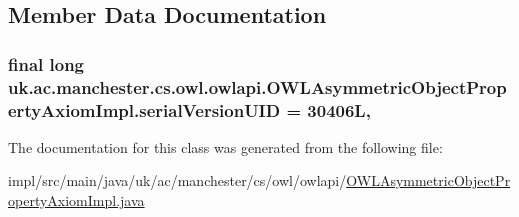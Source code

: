 \subsection{Member Data Documentation}
\hypertarget{classuk_1_1ac_1_1manchester_1_1cs_1_1owl_1_1owlapi_1_1_o_w_l_asymmetric_object_property_axiom_impl_a25ebf0c36f73c88ad27ff5116af9ea59}{
\subsubsection[{serial\-Version\-U\-I\-D}]{\setlength{\rightskip}{0pt plus 5cm}final long uk.\-ac.\-manchester.\-cs.\-owl.\-owlapi.\-O\-W\-L\-Asymmetric\-Object\-Property\-Axiom\-Impl.\-serial\-Version\-U\-I\-D = 30406\-L\hspace{0.3cm}{\ttfamily [static]}, {\ttfamily [private]}}}\label{classuk_1_1ac_1_1manchester_1_1cs_1_1owl_1_1owlapi_1_1_o_w_l_asymmetric_object_property_axiom_impl_a25ebf0c36f73c88ad27ff5116af9ea59}


The documentation for this class was generated from the following file\-:\begin{DoxyCompactItemize}
\item 
impl/src/main/java/uk/ac/manchester/cs/owl/owlapi/\hyperlink{_o_w_l_asymmetric_object_property_axiom_impl_8java}{O\-W\-L\-Asymmetric\-Object\-Property\-Axiom\-Impl.\-java}\end{DoxyCompactItemize}
